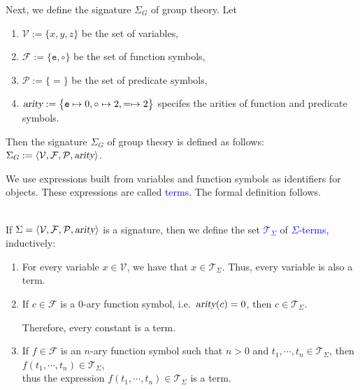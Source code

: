 \exampleEng
Next, we define the signature $\Sigma_G$ of group theory. Let
\begin{enumerate}
\item $\mathcal{V} := \{ x, y, z \}$ be the set of variables,
\item $\mathcal{F} := \{ \mathtt{e}, \circ \}$ be the set of function symbols,
\item $\mathcal{P} := \{\mathtt{=} \}$ be the set of predicate symbols,
\item $\textsl{arity} := \bigl\{ \mathtt{e} \mapsto 0, \mathtt{\circ} \mapsto 2, = \mapsto 2 \bigr\}$
      specifes the arities of function and predicate symbols.
\end{enumerate}
Then the signature $\Sigma_G$ of group theory is defined as follows:
\\[0.2cm]
\hspace*{1.3cm}
$\Sigma_G := \langle \mathcal{V}, \mathcal{F}, \mathcal{P}, \textsl{arity} \rangle$.
\eox
\vspace{0.3cm}

\noindent
We use expressions built from variables and function symbols as identifiers for objects. These expressions are
called \textcolor{blue}{terms}. The formal definition follows.

\begin{Definition} \hspace*{\fill} \\
  If $\Sigma = \langle \mathcal{V}, \mathcal{F}, \mathcal{P}, \textsl{arity} \rangle$ is a signature, then we
  define the set \textcolor{blue}{$\mathcal{T}_\Sigma$}   of
  \textcolor{blue}{$\Sigma$-terms}, 
  inductively:
  \begin{enumerate}
  \item For every variable $x \in \mathcal{V}$, we have that $x \in \mathcal{T}_\Sigma$. Thus, every variable is also a term.
  \item If $c \in \mathcal{F}$ is a $0$-ary function symbol,
        i.e.~$\textsl{arity}(c) = 0$, then $c \in \mathcal{T}_\Sigma$.

        Therefore, every constant is a term.
  \item If $f \in \mathcal{F}$ is an $n$-ary function symbol such that $n > 0$ and 
        $t_1,\cdots,t_n \in \mathcal{T}_\Sigma$, then 
        \\[0.2cm]
        \hspace*{1.3cm} $f(t_1,\cdots,t_n) \in \mathcal{T}_\Sigma$,
        \\[0.2cm]
        thus the expression $f(t_1,\cdots,t_n) \in \mathcal{T}_\Sigma$ is a term.
        \eox
  \end{enumerate}
\end{Definition}

